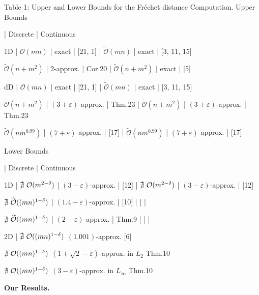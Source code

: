 \par
\par
 Table 1: Upper and Lower Bounds for the Fréchet distance Computation. 
\noindent Upper Bounds\par
\noindent  | Discrete | Continuous\par
\noindent 1D | ${\mathcal{O}}(mn)$ | exact | [21, 1] | $\widetilde{\mathcal{O}}(mn)$ | exact | [3, 11, 15]\par
\noindent $\widetilde{\mathcal{O}}(n+m^{2})$ |  $2$-approx. | Cor.20  | $\widetilde{\mathcal{O}}(n+m^{2})$ | exact | [5]\par
\noindent dD | ${\mathcal{O}}(mn)$ | exact | [21, 1] | $\widetilde{\mathcal{O}}(mn)$ | exact | [3, 11, 15]\par
\noindent $\widetilde{\mathcal{O}}(n+m^{2})$ |  $(3+\varepsilon)$-approx. | Thm.23  | $\widetilde{\mathcal{O}}(n+m^{2})$ |  $(3+\varepsilon)$-approx. | Thm.23 \par
\noindent $\widetilde{\mathcal{O}}(nm^{0.99})$ |  $(7+\varepsilon)$-approx. | [17] | $\widetilde{\mathcal{O}}(nm^{0.99})$ |  $(7+\varepsilon)$-approx. | [17]\par
\noindent Lower Bounds\par
\noindent  | Discrete | Continuous\par
\noindent 1D | $\nexists\nobreak\ {\mathcal{O}}(m^{2-\delta})$ |  $(3-\varepsilon)$-approx. | [12] | $\nexists\nobreak\ {\mathcal{O}}(m^{2-\delta})$ |  $(3-\varepsilon)$-approx. | [12]\par
\noindent $\nexists\nobreak\ \widetilde{\mathcal{O}}((mn)^{1-\delta})$ |  $(1.4-\varepsilon)$-approx. | [10] |  |  | \par
\noindent $\nexists\nobreak\ \widetilde{\mathcal{O}}((mn)^{1-\delta})$ |  $(2-\varepsilon)$-approx. | Thm.9  |  |  | \par
\noindent 2D |  ${\nexists\nobreak\ \mathcal{O}}((mn)^{1-\delta})$ $(1.001)$-approx. [6] \par
\noindent  ${\nexists\nobreak\ \mathcal{O}}((mn)^{1-\delta})$ $(1+\sqrt{2}-\varepsilon)$-approx. in $L_{2}$ Thm.10 \par
\noindent  ${\nexists\nobreak\ \mathcal{O}}((mn)^{1-\delta})$ $(3-\varepsilon)$-approx. in $L_{\infty}$ Thm.10 \par
\par\medskip\noindent\textbf{Our Results.}\par
